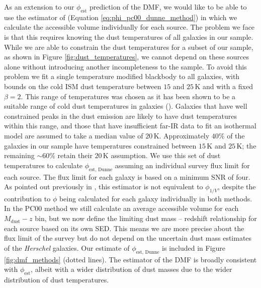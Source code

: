As an extension to our $\phi_{\textrm{est}}$ prediction of the DMF, we would like to be able to use the estimator of \citealt{Dunne_2011} (Equation \ref{eq:phi_pc00_dunne_method}) in which we calculate the accessible volume individually for each source. The problem we face is that this requires knowing the dust temperatures of all galaxies in our sample. While we are able to constrain the dust temperatures for a subset of our sample, as shown in Figure \ref{fig:dust_temperatures}, we cannot depend on these sources alone without introducing another incompleteness to the sample. To avoid this problem we fit a single temperature modified blackbody to all galaxies, with bounds on the cold ISM dust temperature between $15$ and $25\,$K and with a fixed $\beta = 2$. This range of temperatures was chosen as it has been shown to be a suitable range of cold dust temperatures in galaxies (\citealt{Dunne_2001, daCunha_2008, Smith_2012b, Clark_2015, Beeston_2018}). Galaxies that have well constrained peaks in the dust emission are likely to have dust temperatures within this range, and those that have insufficient far-IR data to fit an isothermal model are assumed to take a median value of $20\,$K. Approximately $40\%$ of the galaxies in our sample have temperatures constrained between $15\,$K and $25\,$K; the remaining $\sim 60\%$ retain their $20\,$K assumption. We use this set of dust temperatures to calculate $\phi_{\textrm{est, Dunne}}$ assuming an individual survey flux limit for each source. The flux limit for each galaxy is based on a minimum SNR of four. As pointed out previously in \citealt{Dunne_2011}, this estimator is not equivalent to $\phi_{1/V}$, despite the contribution to $\phi$ being calculated for each galaxy individually in both methods. In the PC00 method we still calculate an average accessible volume for each $M_{\textrm{dust}} - z$ bin, but we now define the limiting dust mass -- redshift relationship for each source based on its own SED. This means we are more precise about the flux limit of the survey but do not depend on the uncertain dust mass estimates of the \textit{Herschel} galaxies. Our estimate of $\phi_{\textrm{est, Dunne}}$ is included in Figure \ref{fig:dmf_methods} (dotted lines). The \citealt{Dunne_2011} estimator of the DMF is broadly consistent with $\phi_{\textrm{est}}$, albeit with a wider distribution of dust masses due to the wider distribution of dust temperatures.

